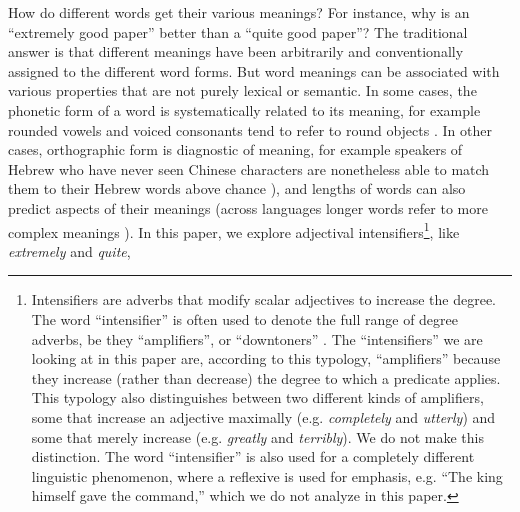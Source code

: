 \documentclass[10pt,letterpaper]{article}
\newcommand{\w}[1]{\emph{#1}}
\begin{document}
How do different words get their various meanings? For instance, why is an ``extremely good paper'' better than a ``quite good paper''? The traditional answer \cite{saussure} is that different meanings have been arbitrarily and conventionally assigned to the different word forms.
% 
But word meanings can be associated with various properties that are not purely lexical or semantic. In some cases, the phonetic form of a word is systematically related to its meaning, for example rounded vowels and voiced consonants tend to refer to round objects \cite{maluma-takete, bouba-kiki, bouba-kiki2, takete-uloomo}. In other cases, orthographic form is diagnostic of meaning, for example speakers of Hebrew who have never seen Chinese characters are nonetheless able to match them to their Hebrew words above chance \cite{koriat}), and lengths of words can also predict aspects of their meanings (across languages longer words refer to more complex meanings \cite{lewis}).
In this paper,
we explore adjectival intensifiers\footnote{Intensifiers are adverbs that modify scalar adjectives to increase the degree. The word ``intensifier'' is often used to denote the full range of degree adverbs, be they ``amplifiers'', or ``downtoners'' \cite{quirk}. The ``intensifiers'' we are looking at in this paper are, according to this typology, ``amplifiers'' because they increase (rather than decrease) the degree to which a predicate applies. This typology also distinguishes between two different kinds of amplifiers, some that increase an adjective maximally (e.g. \w{completely} and \w{utterly}) and some that merely increase (e.g. \w{greatly} and \w{terribly}). We do not make this distinction. The word ``intensifier'' is also used for a completely different linguistic phenomenon, where a reflexive is used for emphasis, e.g. ``The king himself gave the command,'' which we do not analyze in this paper.}, like \w{extremely} and \w{quite},
\end{document}
